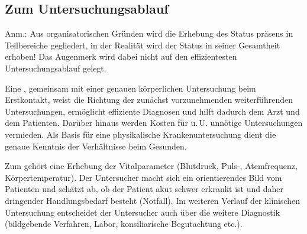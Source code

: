 

\subsection{Zum Untersuchungsablauf}

Anm.: Aus organisatorischen Gründen wird die Erhebung des
Status präsens in Teilbereiche gegliedert, in der Realität
wird der Status in seiner Gesamtheit erhoben!
Das Augenmerk wird dabei nicht auf den effizientesten
Untersuchungsablauf gelegt.

Eine , gemeinsam mit einer genauen
körperlichen Untersuchung beim Erstkontakt, weist die
Richtung der zunächst vorzunehmenden weiterführenden
Untersuchungen, ermöglicht effiziente Diagnosen und hilft
dadurch dem Arzt und dem Patienten.
Darüber hinaus werden Kosten für u.\,U. unnötige
Untersuchungen vermieden. Als Basis für eine physikalische
Krankenuntersuchung dient die genaue Kenntnis der
Verhältnisse beim Gesunden.

Zum  gehört eine Erhebung der
Vitalparameter (Blutdruck, Puls-, Atemfrequenz,
Körpertemperatur). Der Untersucher macht sich ein
orientierendes Bild vom Patienten und schätzt ab, ob der
Patient akut schwer erkrankt ist und daher dringender
Handlungsbedarf besteht (Notfall). Im weiteren Verlauf der klinischen Untersuchung entscheidet der
Untersucher auch über die weitere Diagnostik (bildgebende
Verfahren, Labor, konsiliarische Begutachtung etc.).


